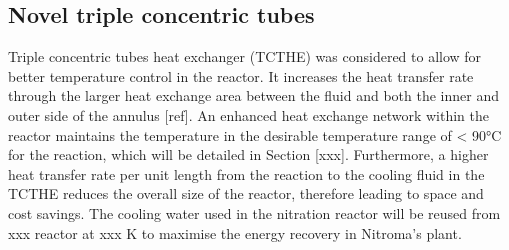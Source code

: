 \subsection{Novel triple concentric tubes}
\label{sec:tripleconctube}
Triple concentric tubes heat exchanger (TCTHE) was considered to allow for better temperature control in the reactor. It increases the heat transfer rate through the larger heat exchange area between the fluid and both the inner and outer side of the annulus [ref]. An enhanced heat exchange network within the reactor maintains the temperature in the desirable temperature range of < 90°C for the reaction, which will be detailed in Section [xxx]. Furthermore, a higher heat transfer rate per unit length from the reaction to the cooling fluid in the TCTHE reduces the overall size of the reactor, therefore leading to space and cost savings. The cooling water used in the nitration reactor will be reused from xxx reactor at xxx K to maximise the energy recovery in Nitroma's plant. 

